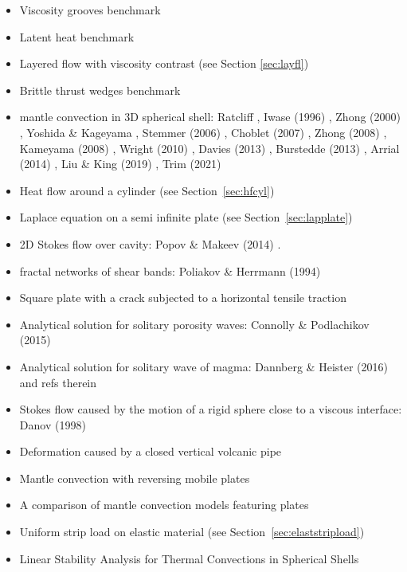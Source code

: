 \begin{itemize}
\item Viscosity grooves benchmark \cite{aspectmanual}
\item Latent heat benchmark \cite{aspectmanual}
\item Layered flow with viscosity contrast \cite{aspectmanual} (see Section \ref{sec:layfl}) 
\item Brittle thrust wedges benchmark \cite{busa16,aspectmanual}
\item mantle convection in 3D spherical shell:
      Ratcliff \etal \cite{rasz96},
      Iwase (1996) \cite{iwas96},
      Zhong \etal (2000) \cite{zhzm00},
      Yoshida \& Kageyama \cite{yoka04},
      Stemmer \etal (2006) \cite{sthh06},
      Choblet \etal (2007) \cite{chcc07},
      Zhong \etal (2008) \cite{zhmt08},
      Kameyama \etal (2008) \cite{kaks08},
      Wright \etal (2010) \cite{wrfy10},
      Davies \etal (2013) \cite{dadb13},
      Burstedde \etal (2013) \cite{busa13},
      Arrial \etal (2014) \cite{arfw14},
      Liu \& King (2019) \cite{liki19},
      Trim \etal (2021) \cite{trbs21}
\item Heat flow around a cylinder (see Section~\ref{sec:hfcyl})
\item Laplace equation on a semi infinite plate (see Section~\ref{sec:lapplate})
\item 2D Stokes flow over cavity: Popov \& Makeev (2014) \cite{poma14}.
\item fractal networks of  shear bands: Poliakov \& Herrmann (1994) \cite{pohe94}
\item Square plate with a crack subjected to a horizontal tensile traction \cite{litu02}
\item Analytical solution for solitary porosity waves: Connolly \& Podlachikov (2015) \cite{copo15}
\item Analytical solution for solitary wave of magma: Dannberg \& Heister (2016) \cite{dahe16} and refs therein
\item Stokes flow caused by the motion of a rigid sphere close to a viscous interface: 
      Danov \etal (1998)  \cite{dagr98}
\item Deformation caused by a closed vertical volcanic pipe \cite{boda99}
\item Mantle convection with reversing mobile plates \cite{kogk05}
\item A comparison of mantle convection models featuring plates \cite{stlh14}
\item Uniform strip load on elastic material (see Section~\ref{sec:elaststripload})
\item Linear Stability Analysis for Thermal Convections in Spherical Shells \cite{yuwa19}

\end{itemize}
